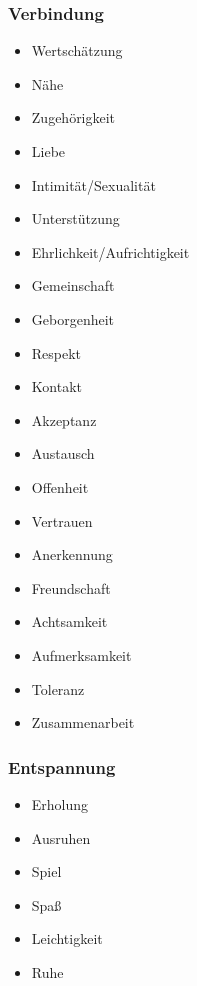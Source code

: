 \subsubsection{Verbindung}

\begin{multicols}{2}
  \begin{itemize}
    \item Wertschätzung
    \item Nähe
    \item Zugehörigkeit
    \item Liebe
    \item Intimität/Sexualität
    \item Unterstützung
    \item Ehrlichkeit/Aufrichtigkeit
    \item Gemeinschaft
    \item Geborgenheit
    \item Respekt
    \item Kontakt
    \item Akzeptanz
    \item Austausch
    \item Offenheit
    \item Vertrauen
    \item Anerkennung
    \item Freundschaft
    \item Achtsamkeit
    \item Aufmerksamkeit
    \item Toleranz
    \item Zusammenarbeit
  \end{itemize}
\end{multicols}


\subsubsection{Entspannung}

\begin{multicols}{2}
  \begin{itemize}
    \item Erholung
    \item Ausruhen
    \item Spiel
    \item Spaß
    \item Leichtigkeit
    \item Ruhe
  \end{itemize}
\end{multicols}


